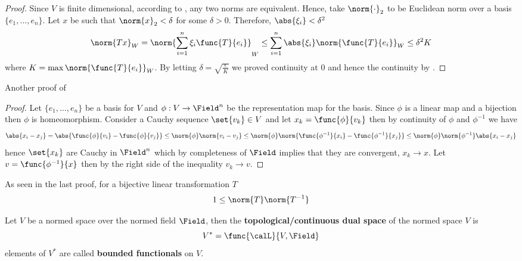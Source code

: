 \begin{proof}
    Since \(V\) is finite dimensional, according to , any two norms are equivalent. Hence, take \(\norm{\cdot}_2\) to be Euclidean norm over a basis \(\{e_1, \dots , e_n\}\). Let \(x\) be such that \(\norm{x}_2 < \delta\) for some \(\delta > 0\). Therefore, \(\abs{\xi_i} < \delta^2\)
    \begin{equation*}
        \norm{Tx}_W = \norm{\sum_{i = 1}^n \xi_i \func{T}{e_i}}_W \leq \sum_{i = 1}^n \abs{\xi_i} \norm{\func{T}{e_i}}_W \leq \delta^2 K
    \end{equation*}
    where \(K = \max \norm{\func{T}{e_i}}_W \). By letting \(\delta = \sqrt{\frac{\epsilon}{K}}\) we proved continuity at \(0\) and hence the continuity by .
\end{proof}

Another proof of 

\begin{proof}
    Let \(\{e_1, \dots , e_n\}\) be a basis for \(V\) and \(\phi : V \to \Field^n\) be the representation map for the basis. Since \(\phi\) is a linear map and a bijection then \(\phi\) is homeomorphism. Consider a Cauchy sequence \(\set{v_k} \in V\) and let \(x_k = \func{\phi}{v_k}\) then by continuity of \(\phi\) and \(\phi^{-1}\) we have
    \begin{equation*}
        \abs{x_i - x_j} = \abs{\func{\phi}{v_i} - \func{\phi}{v_j}} \leq \norm{\phi} \norm{v_i - v_j} \leq \norm{\phi} \norm{\func{\phi^{-1}}{x_i} - \func{\phi^{-1}}{x_j}} \leq \norm{\phi} \norm{\phi^{-1}} \abs{x_i - x_j}
    \end{equation*}
    hence \(\set{x_k}\) are Cauchy in \(\Field^n\) which by completeness of \(\Field\) implies that they are convergent, \(x_k \to x\). Let \(v = \func{\phi^{-1}}{x}\) then by the right side of the inequality \(v_k \to v\).
\end{proof}

\begin{remark}
    As seen in the last proof, for a bijective linear transformation \(T\)
    \begin{equation*}
        1 \leq \norm{T} \norm{T^{-1}}
    \end{equation*}
\end{remark}

\begin{definition}
    Let \(V\) be a normed space over the normed field \(\Field\), then the \textbf{topological/continuous dual space} of the normed space \(V\) is
    \begin{equation*}
        V^\ast  = \func{\calL}{V,\Field}
    \end{equation*}
    elements of \(V^\ast\) are called \textbf{bounded functionals} on \(V\).
\end{definition}


